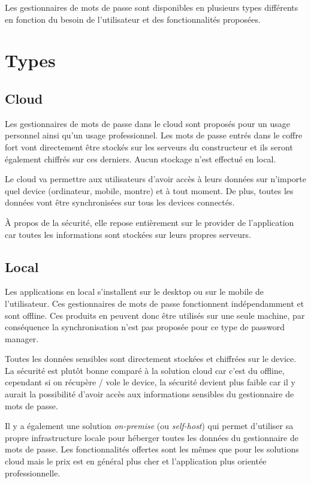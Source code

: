 Les gestionnaires de mots de passe sont disponibles en plusieurs types différents en fonction du besoin de l'utilisateur et des fonctionnalités proposées. 

\section{Types}

\subsection{Cloud}
Les gestionnaires de mots de passe dans le cloud sont proposés pour un usage personnel ainsi qu'un usage professionnel. Les mots de passe entrés dans le coffre fort vont directement être stockés sur les serveurs du constructeur et ils seront également chiffrés sur ces derniers. Aucun stockage n'est effectué en local.

Le cloud va permettre aux utilisateurs d'avoir accès à leurs données sur n'importe quel device (ordinateur, mobile, montre) et à tout moment. De plus, toutes les données vont être synchronisées sur tous les devices connectés.

À propos de la sécurité, elle repose entièrement sur le provider de l'application car toutes les informations sont stockées sur leurs propres serveurs.

\subsection{Local}
Les applications en local s'installent sur le desktop ou sur le mobile de l'utilisateur. Ces gestionnaires de mots de passe fonctionnent indépendamment et sont offline. Ces produits en peuvent donc être utilisés sur une seule machine, par conséquence la synchronisation n'est pas proposée pour ce type de password manager. 

Toutes les données sensibles sont directement stockées et chiffrées sur le device. La sécurité est plutôt bonne comparé à la solution cloud car c'est du offline, cependant si on récupère / vole le device, la sécurité devient plus faible car il y aurait la possibilité d'avoir accès aux informations sensibles du gestionnaire de mots de passe. 

Il y a également une solution \textit{on-premise} (ou \textit{self-host}) qui permet d'utiliser sa propre infrastructure locale pour héberger toutes les données du gestionnaire de mots de passe. Les fonctionnalités offertes sont les mêmes que pour les solutions cloud mais le prix est en général plus cher et l'application plus orientée professionnelle.

